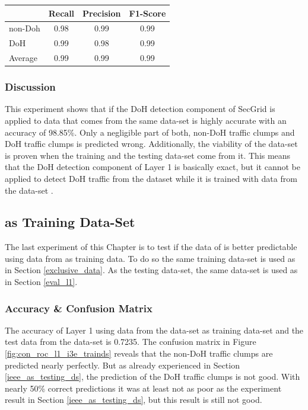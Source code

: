 \begin{center}
\begin{longtable}{ |l|c|c|c| }
\hline
 & Recall & Precision & F1-Score \\
\hline
non-Doh & 0.98 & 0.99 & 0.99 \\
\hline
DoH & 0.99 & 0.98 & 0.99 \\
\hline
Average & 0.99 & 0.99 & 0.99 \\ 
\hline
\end{longtable}
\label{tab:rpf1l1_i3e_train_testds}
\end{center}

\subsubsection{Discussion}
This experiment shows that if the DoH detection component of SecGrid is applied to data that comes from the same data-set is highly accurate with an accuracy of 98.85\%. Only a negligible part of both, non-DoH traffic clumps and DoH traffic clumps is predicted wrong. Additionally, the viability of the data-set \cite{ieee_dataset} is proven when the training and the testing data-set come from it. This means that the DoH detection component of Layer 1 is basically exact, but it cannot be applied to detect DoH traffic from the dataset \cite{ieee_dataset} while it is trained with data from the data-set \cite{CIRA-CIC-DoHBrw-2020}.

\subsection{\cite{ieee_dataset} as Training Data-Set}
The last experiment of this Chapter is to test if the data of \cite{CIRA-CIC-DoHBrw-2020} is better predictable using data from \cite{ieee_dataset} as training data. To do so the same training data-set is used as in Section \ref{exclusive_data}. As the testing data-set, the same data-set is used as in Section \ref{eval_l1}.

\subsubsection{Accuracy \& Confusion Matrix}
The accuracy of Layer 1 using data from the data-set \cite{ieee_dataset} as training data-set and the test data from the data-set \cite{CIRA-CIC-DoHBrw-2020} is 0.7235. The confusion matrix in Figure \ref{fig:con_roc_l1_i3e_trainds} reveals that the non-DoH traffic clumps are predicted nearly perfectly. But as already experienced in Section \ref{ieee_as_testing_ds}, the prediction of the DoH traffic clumps is not good. With nearly 50\% correct predictions it was at least not as poor as the experiment result in Section \ref{ieee_as_testing_ds}, but this result is still not good.

